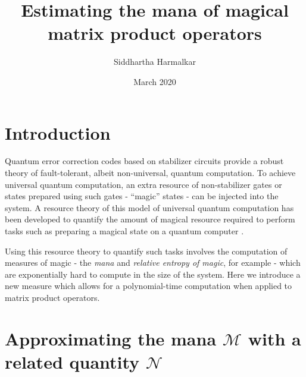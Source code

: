 \documentclass{article}
\title{Estimating the mana of magical matrix product operators}
\author{Siddhartha Harmalkar}
\date{March 2020}
\begin{document}
\maketitle

\section{Introduction}

Quantum error correction codes based on stabilizer circuits provide a robust theory of fault-tolerant, albeit non-universal, quantum computation. To achieve universal quantum computation, an extra resource of non-stabilizer gates or states prepared using such gates - ``magic'' states - can be injected into the system. A resource theory of this model of universal quantum computation has been developed to quantify the amount of magical resource required to perform tasks such as preparing a magical state on a quantum computer \cite{Veitch_2014}. 

Using this resource theory to quantify such tasks involves the computation of measures of magic - the \textit{mana} and \textit{relative entropy of magic}, for example \cite{Veitch_2014} - which are exponentially hard to compute in the size of the system. Here we introduce a new measure which allows for a polynomial-time computation when applied to matrix product operators.


\section{Approximating the mana $\mathcal M$ with a related quantity $\mathcal N$}
\end{document}
